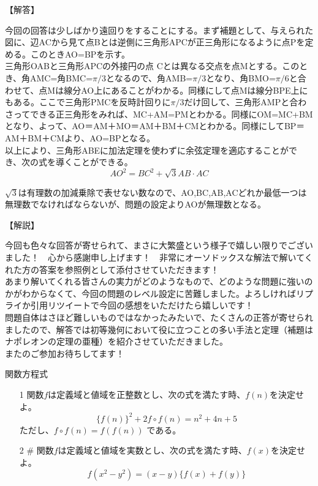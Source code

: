 \documentclass[a4paper,fleqn,dvipdfmx]{jsarticle}
\begin{document}
\begin{flushleft}
【解答】
\end{flushleft}

今回の回答は少しばかり遠回りをすることにする。まず補題として、与えられた図に、辺ACから見て点Bとは逆側に三角形APCが正三角形になるように点Pを定める。このときAO=BPを示す。\\
三角形OABと三角形APCの外接円の点 Cとは異なる交点を点Mとする。このとき、角AMC=角BMC=$\pi/3$となるので、角AMB=$\pi/3$となり、角BMO=$\pi/6$と合わせて、点Mは線分AO上にあることがわかる。同様にして点Mは線分BPE上にもある。ここで三角形PMCを反時計回りに$\pi/3$だけ回して、三角形AMPと合わさってできる正三角形をみれば、MC+AM=PMとわかる。同様にOM=MC+BMとなり、よって、AO＝AM＋MO＝AM＋BM＋CMとわかる。同様にしてBP＝AM＋BM＋CMより、AO=BPとなる。\\
以上により、三角形ABEに加法定理を使わずに余弦定理を適応することができ、次の式を導くことができる。\\

$$AO^2=BC^2+\sqrt{3}AB\cdot AC$$

$\sqrt{3}$は有理数の加減乗除で表せない数なので、AO,BC,AB,ACどれか最低一つは無理数でなければならないが、問題の設定よりAOが無理数となる。


\begin{flushleft}
【解説】
\end{flushleft}

今回も色々な回答が寄せられて、まさに大繁盛という様子で嬉しい限りでございました！　心から感謝申し上げます！　非常にオーソドックスな解法で解いてくれた方の答案を参照例として添付させていただきます！\\
あまり解いてくれる皆さんの実力がどのようなもので、どのような問題に強いのかがわからなくて、今回の問題のレベル設定に苦難しました。よろしければリプライか引用リツイートで今回の感想をいただけたら嬉しいです！\\
問題自体はさほど難しいものではなかったみたいで、たくさんの正答が寄せられましたので、解答では初等幾何において役に立つことの多い手法と定理（補題はナポレオンの定理の亜種）を紹介させていただきました。\\
またのご参加お待ちしてます！



\newpage

\begin{itembox}[l]{関数方程式}

\begin{itemize}
    \item [1] 
        関数$f$は定義域と値域を正整数とし、次の式を満たす時、$f(n)$を決定せよ。
        $$\{f(n)\}^2+2f\circ f(n)=n^2+4n+5$$
        ただし、$f\circ f(n)=f(f(n))$ である。
    
    \item [2] \#
    関数$f$は定義域と値域を実数とし、次の式を満たす時、$f(x)$を決定せよ。
    $$f(x^2-y^2)=(x-y)\{f(x)+f(y)\}$$
\end{itemize}
\end{itembox}
\end{document}
